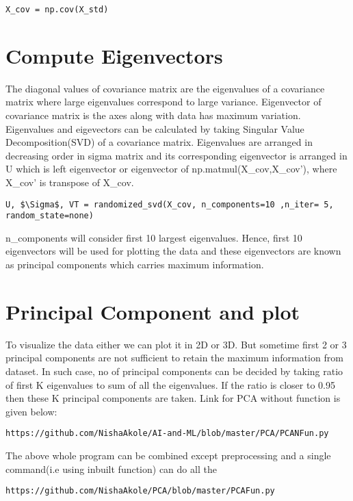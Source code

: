 \documentclass[journal,12pt,twocolumn]{IEEEtran}
\begin{document}
\begin{lstlisting}[mathescape=true]
X_cov = np.cov(X_std)
\end{lstlisting}

\section{Compute Eigenvectors}
The diagonal values of covariance matrix are the eigenvalues of a covariance matrix where large eigenvalues correspond to large variance. Eigenvector of covariance matrix is the axes along with data has maximum variation. Eigenvalues and eigevectors can be calculated by taking Singular Value Decomposition(SVD) of a covariance matrix. Eigenvalues are arranged in decreasing order in sigma matrix and its corresponding eigenvector is arranged in U which is left eigenvector or eigenvector of np.matmul(X\_cov,X\_cov'), where X\_cov' is transpose of X\_cov.
\begin{lstlisting}[mathescape=true]
U, $\Sigma$, VT = randomized_svd(X_cov, n_components=10 ,n_iter= 5, random_state=none)
\end{lstlisting}
n\_components will consider first 10 largest eigenvalues. Hence, first 10 eigenvectors will be used for plotting the data and these eigenvectors are known as principal components which carries maximum information.

\section{Principal Component and plot}
To visualize the data either we can plot it in 2D or 3D. But sometime first 2 or 3 principal components are not sufficient to retain the maximum information from dataset. In such case, no of principal components can be decided by taking ratio of first K eigenvalues to sum of all the eigenvalues. If the ratio is closer to 0.95 then these K principal components are taken. Link for PCA without function is given below:
\begin{lstlisting}[mathescape=true]
https://github.com/NishaAkole/AI-and-ML/blob/master/PCA/PCANFun.py
\end{lstlisting}
  
The above whole program can be combined except preprocessing and a single command(i.e using inbuilt function) can do all the  
\begin{lstlisting}[mathescape=true]
https://github.com/NishaAkole/PCA/blob/master/PCAFun.py
\end{lstlisting}
\end{document}
